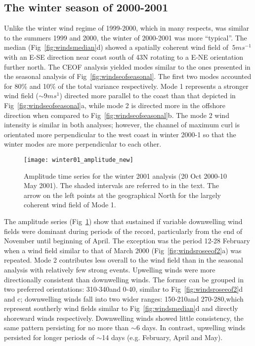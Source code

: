 \subsection{The winter season of 2000-2001}
Unlike the winter wind regime of 1999-2000, which in many
respects, was similar to the summers 1999 and 2000,  the winter of
2000-2001 was more ``typical''. The median
(Fig~\ref{fig:windsmedian}d) showed a spatially coherent wind
field of $~5ms^{-1}$ with an E-SE direction near coast south of
43\deg N rotating to a E-NE orientation further north. The CEOF
analysis yielded modes similar to the ones presented in the
seasonal analysis of Fig~\ref{fig:windseofseasonal}. The first two
modes accounted for 80\% and 10\% of the total variance
respectively. Mode 1 represents a stronger wind field ($\sim
9ms^1$) directed more parallel to the coast than that depicted in
Fig~\ref{fig:windseofseasonal}a, while mode 2 is directed more in
the offshore direction when compared to
Fig~\ref{fig:windseofseasonal}b. The mode 2 wind intensity is
similar in both analyses; however, the channel of maximum curl is
orientated more perpendicular to the west coast in winter 2000-1
so that the winter modes are more perpendicular to each other.
\begin{figure}
\texttt{[image: winter01\_amplitude\_new]}
\caption{Amplitude time series for the winter 2001 analysis (20
Oct 2000-10 May 2001). The shaded intervals are referred to in the
text. The arrow on the left points at the geographical North for
the largely coherent wind field of Mode 1.}
\label{fig:winter_01_amp}
\end{figure}

The amplitude series ({Fig~\ref{fig:winter_01_amp}}) show that
sustained if variable downwelling wind fields were dominant during
periods of the record, particularly from the end of November until
beginning of April. The exception was the period 12-28 February
when a wind field similar to that of March 2000
(Fig~\ref{fig:windsroseeof2}a) was repeated. Mode 2 contributes
less overall to the wind field than in the seasonal analysis with
relatively few strong events. Upwelling winds were more
directionally consistent than downwelling winds. The former can be
grouped in two preferred orientations: 310-340\deg and 0-40\deg,
similar to Fig~\ref{fig:windsroseeof2}d and c; downwelling winds
fall into two wider ranges: 150-210\deg and 270-280\deg ,which
represent southerly wind fields similar to
Fig~\ref{fig:windsmedian}d and directly shoreward winds
respectively. Downwelling winds showed little consistency, the
same pattern persisting for no more than $\sim$6 days. In
contrast, upwelling winds persisted for longer periods of $\sim$14
days (e.g. February, April and May).

